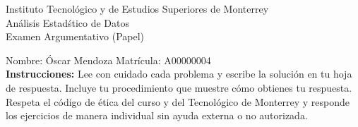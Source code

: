 \documentclass[10pt]{report}
\begin{document}
\newpage



\begin{center}
{\large Instituto Tecnol\'{o}gico y de Estudios Superiores de Monterrey \\
An\'alisis Estad\'stico de Datos } \\
Examen Argumentativo (Papel)
\end{center}

Nombre: \underline{\hspace*{.2in}}
Óscar Mendoza
\underline{\hspace*{.2in}} \quad Matr\'icula:\underline{\hspace*{.2in}}
A00000004
\underline{\hspace*{.2in}} \\

{\bf Instrucciones:} Lee con cuidado cada problema y escribe la soluci\'on
en tu hoja de respuesta. Incluye tu procedimiento que muestre c\'omo obtienes tu respuesta.  Respeta el c\'odigo de \'etica del curso y del Tecnol\'ogico de Monterrey y responde los ejercicios de manera individual sin ayuda externa o no autorizada.
\end{document}
